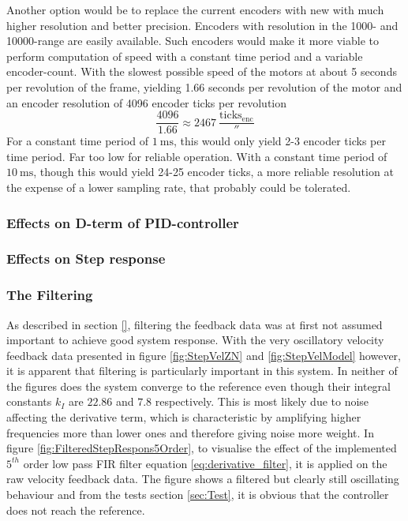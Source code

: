 \documentclass[../../main.tex]{subfiles}
\begin{document}
Another option would be to replace the current encoders with new with much higher resolution and better precision. Encoders with resolution in the 1000- and 10000-range are easily available. Such encoders would make it more viable to perform computation of speed with a constant time period and a variable encoder-count. With the slowest possible speed of the motors at about 5 seconds per revolution of the frame, yielding 1.66 seconds per revolution of the motor and an encoder resolution of 4096 encoder ticks per revolution 
\begin{equation}
    \frac{4096}{1.66} \approx \SI{ 2467 }{ \frac{ \mathrm{ ticks_{enc} } }{ \second } } 
\end{equation}
For a constant time period of $\SI{ 1 }{ \milli \second }$, this would only yield 2-3 encoder ticks per time period. Far too low for reliable operation. With a constant time period of $\SI{ 10 }{ \milli \second }$, though this would yield 24-25 encoder ticks, a more reliable resolution at the expense of a lower sampling rate, that probably could be tolerated.

\subsubsection*{Effects on D-term of PID-controller}

\subsubsection*{Effects on Step response}

\subsubsection*{The Filtering} \label{subsec:TheFiltering}
As described in section \ref{}, filtering the feedback data was at first not assumed important to achieve good system response. With the very oscillatory velocity feedback data presented in figure \ref{fig:StepVelZN} and \ref{fig:StepVelModel} however, it is apparent that filtering is particularly important in this system. In neither of the figures does the system converge to the reference even though their integral constants $k_I$ are $22.86$ and $7.8$ respectively. This is most likely due to noise affecting the derivative term, which is characteristic by amplifying higher frequencies more than lower ones and therefore giving noise more weight. In figure \ref{fig:FilteredStepRespons5Order}, to visualise the effect of the implemented $5^{th}$ order low pass FIR filter equation \ref{eq:derivative_filter}, it is applied on the raw velocity feedback data. The figure shows a filtered but clearly still oscillating behaviour and from the tests section \ref{sec:Test}, it is obvious that the controller does not reach the reference.
\end{document}
